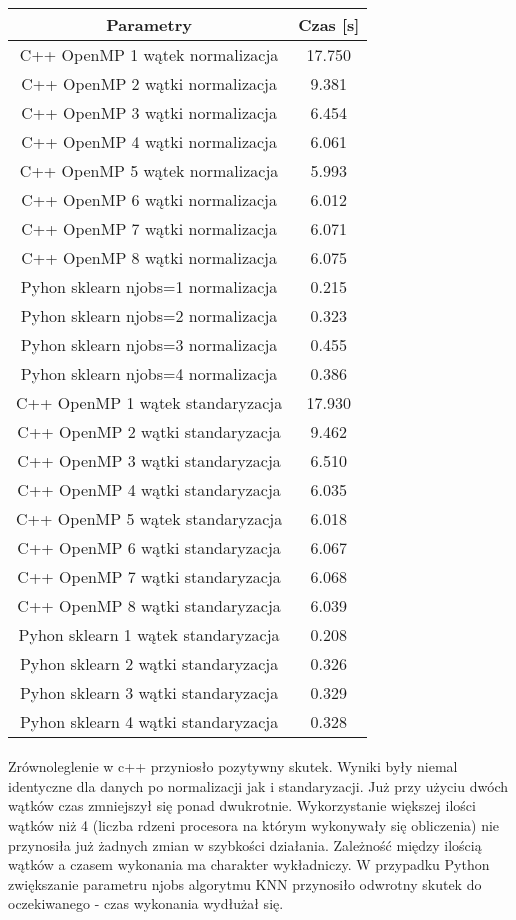 \documentclass[a4paper,11pt]{article}
\begin{document}
\paragraph{}
\begin{tabular}{|c|c|}
\hline Parametry&Czas [s] \\ 
\hline C++ OpenMP 1 wątek normalizacja& 17.750 \\
\hline C++ OpenMP 2 wątki normalizacja& 9.381 \\
\hline C++ OpenMP 3 wątki normalizacja& 6.454  \\
\hline C++ OpenMP 4 wątki normalizacja& 6.061 \\
\hline C++ OpenMP 5 wątek normalizacja& 5.993 \\
\hline C++ OpenMP 6 wątki normalizacja& 6.012 \\
\hline C++ OpenMP 7 wątki normalizacja& 6.071  \\
\hline C++ OpenMP 8 wątki normalizacja& 6.075 \\\hline
\hline Pyhon sklearn njobs=1 normalizacja& 0.215 \\
\hline Pyhon sklearn njobs=2 normalizacja& 0.323 \\
\hline Pyhon sklearn njobs=3 normalizacja& 0.455 \\
\hline Pyhon sklearn njobs=4 normalizacja& 0.386 \\\hline
\hline C++ OpenMP 1 wątek standaryzacja& 17.930 \\
\hline C++ OpenMP 2 wątki standaryzacja& 9.462 \\ 
\hline C++ OpenMP 3 wątki standaryzacja& 6.510 \\ 
\hline C++ OpenMP 4 wątki standaryzacja& 6.035 \\
\hline C++ OpenMP 5 wątek standaryzacja& 6.018 \\
\hline C++ OpenMP 6 wątki standaryzacja& 6.067 \\ 
\hline C++ OpenMP 7 wątki standaryzacja& 6.068 \\ 
\hline C++ OpenMP 8 wątki standaryzacja& 6.039 \\
\hline
\hline Pyhon sklearn 1 wątek standaryzacja& 0.208 \\
\hline Pyhon sklearn 2 wątki standaryzacja& 0.326 \\
\hline Pyhon sklearn 3 wątki standaryzacja& 0.329 \\
\hline Pyhon sklearn 4 wątki standaryzacja& 0.328 \\\hline
\end{tabular}
\paragraph{}
Zrównoleglenie w c++ przyniosło pozytywny skutek. Wyniki były niemal identyczne dla danych po normalizacji jak i standaryzacji. Już przy użyciu dwóch wątków czas zmniejszył się ponad dwukrotnie. Wykorzystanie większej ilości wątków niż 4 (liczba rdzeni procesora na którym wykonywały się obliczenia) nie przynosiła już żadnych zmian w szybkości działania. Zależność między ilością wątków a czasem wykonania ma charakter wykładniczy.
W przypadku Python zwiększanie parametru njobs algorytmu KNN przynosiło odwrotny skutek do oczekiwanego - czas wykonania wydłużał się.
\end{document}
